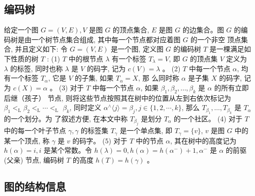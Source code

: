 \documentclass[a4paper]{apa6}
\begin{document}
\subsection{编码树}
\label{sec:orgef3d6e8}
给定一个图 \(G=(V, E), V\) 是图 \(G\) 的顶点集合, \(E\) 是图 \(G\) 的边集合。图 \(G\) 的编码树是由一个树节点集合组成, 其中每一个节点都对应着图 \(G\) 的一个非空 顶点集合, 并且定义如下:
令 \(G=(V, E)\) 是一个图, 定义图 \(G\) 的编码树 \(T\) 是一棵满足如下性质的树 \(T\) :
(1) \(T\) 中的根节点 \(\lambda\) 有一个标签 \(T_{\lambda}=V\), 即 \(G\) 的顶点集 \(V\) 定义为 \(\lambda\) 的标签,
同时也称 \(\lambda\) 是 \(V\) 的码字, 记为 \(c(V)=\lambda\) 。
(2) \(T\) 中每一个节点 \(\alpha\), 均有一个标签 \(T_{\alpha}\), 它是 \(V\) 的子集, 如果 \(T_{\alpha}=X\), 那 么同时称 \(\alpha\) 是子集 \(X\) 的码字, 记为 \(c(X)=\alpha\) 。
(3) 对于 \(T\) 中每一个节点 \(\alpha\), 如果 \(\beta_{1}, \beta_{2}, \ldots, \beta_{k}\) 是 \(\alpha\) 的所有立即后继（孩子） 节点, 则将这些节点按照其在树中的位置从左到右依次标记为 \(\beta_{1}<_{\mathrm{L}} \beta_{2}<_{\mathrm{L}} \cdots<_{\mathrm{L}}\) \(\beta_{k}\), 同时定义 \(\alpha^{\wedge}\langle j\rangle=\beta_{j}, j \in\{1,2, \cdots, k\}\), 那么 \(T_{\beta_{1}}, \ldots, T_{\beta_{k}}\) 是 \(T_{\alpha}\) 的一个划分。为 了叙述方便, 在本文中称 \(T_{\beta_{j}}\) 是划分 \(T_{\alpha}\) 的一个社区。
(4) 对于 \(T\) 中的每一个叶子节点 \(\gamma, \gamma\) 的标签集 \(T_{\gamma}\) 是一个单点集, 即 \(T_{\gamma}=\{v\}\), \(v\) 是图 \(G\) 中的某一个顶点, 称 \(\gamma\) 是 \(v\) 的码字。
(5) 对于 \(T\) 中的节点 \(\alpha\), 其在树中的高度记为 \(h(\alpha)=i, i\) 是某个常数。令 \(h(\lambda)=0, h(\alpha)=h\left(\alpha^{-}\right)+1, \alpha^{-}\) 是 \(\alpha\) 的前驱 (父亲) 节点, 编码树 \(T\) 的高度 \(h(T)=h(\gamma)\) 。

\subsection{图的结构信息}
\label{sec:org3f14d17}
\end{document}
